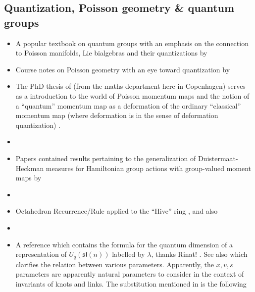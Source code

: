 \documentclass[notitlepage, 10pt]{article}
\begin{document}
\subsection{Quantization, Poisson geometry \& quantum groups}
\begin{itemize}
    \item A popular textbook on quantum groups with an emphasis on the connection to Poisson manifolds, Lie bialgebras and their quantizations by \citeauthor{chari1995guide} \cite{chari1995guide}
    \item Course notes on Poisson geometry with an eye toward quantization by \citeauthor{ciccoli2006poisson} \cite{ciccoli2006poisson}
    \item The PhD thesis of \citeauthor{esposito2012classical} (from the maths department here in Copenhagen) serves as a introduction to the world of Poisson momentum maps and the notion of a ``quantum'' momentum map as a deformation of the ordinary ``classical'' momentum map (where deformation is in the sense of deformation quantization) \cite{esposito2012classical}.
    \item \citeauthor{alekseev1997poisson} \cite{alekseev1997poisson}
    \item Papers contained results pertaining to the generalization of Duistermaat-Heckman measures for Hamiltonian group actions with group-valued moment maps by \citeauthor{alekseev2000group} \cite{alekseev1999duistermaat,alekseev2000group}
    \item \citeauthor{kirillov1990representations} \cite{kirillov1990representations}
    \item Octahedron Recurrence/Rule \citeauthor{robbins1986determinants} \cite{robbins1986determinants} applied to the ``Hive'' ring \citeauthor{knutson2003positive} \cite{knutson2003positive}, and also \citeauthor{henriques2006octahedron} \cite{henriques2006octahedron}
    \item \citeauthor{henriques2005crystals} \cite{henriques2005crystals}
    \item A reference which contains the formula for the quantum dimension of a representation of $U_{q}(\mathfrak{sl}(n))$ labelled by $\lambda$, thanks Rinat! \cite{aiston1997skein}. See also \cite{aiston1998idempotents} which clarifies the relation between various parameters. Apparently, the $x,v,s$ parameters are apparently natural parameters to consider in the context of invariants of knots and links. The substitution mentioned in \cite{aiston1998idempotents} is the following
        \begin{equation*}

\end{equation*}
\end{itemize}
\end{document}
